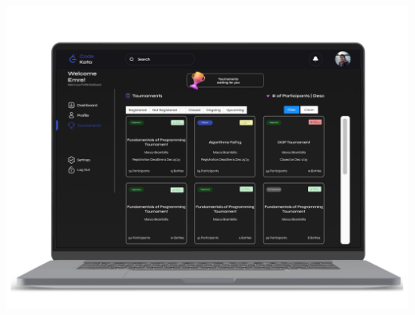 \begin{center}
    \includegraphics[scale=0.13]{Images/ui-ux/student_tournaments/student_tournaments_1.png}

\end{center}
